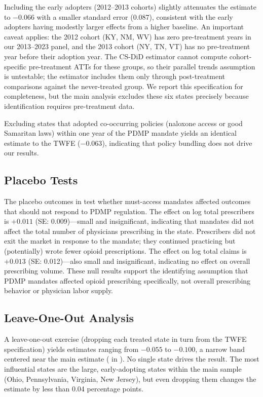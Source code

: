 \documentclass[12pt]{article}
\begin{document}
Including the early adopters (2012--2013 cohorts) slightly attenuates the estimate to $-0.066$ with a smaller standard error (0.087), consistent with the early adopters having modestly larger effects from a higher baseline. An important caveat applies: the 2012 cohort (KY, NM, WV) has zero pre-treatment years in our 2013--2023 panel, and the 2013 cohort (NY, TN, VT) has no pre-treatment year before their adoption year. The CS-DiD estimator cannot compute cohort-specific pre-treatment ATTs for these groups, so their parallel trends assumption is untestable; the estimator includes them only through post-treatment comparisons against the never-treated group. We report this specification for completeness, but the main analysis excludes these six states precisely because identification requires pre-treatment data.

Excluding states that adopted co-occurring policies (naloxone access or good Samaritan laws) within one year of the PDMP mandate yields an identical estimate to the TWFE ($-0.063$), indicating that policy bundling does not drive our results.

\subsection{Placebo Tests}\label{sec:robust_placebo}

The placebo outcomes in  test whether must-access mandates affected outcomes that should not respond to PDMP regulation. The effect on log total prescribers is $+0.011$ (SE: 0.009)---small and insignificant, indicating that mandates did not affect the total number of physicians prescribing in the state. Prescribers did not exit the market in response to the mandate; they continued practicing but (potentially) wrote fewer opioid prescriptions. The effect on log total claims is $+0.013$ (SE: 0.012)---also small and insignificant, indicating no effect on overall prescribing volume. These null results support the identifying assumption that PDMP mandates affected opioid prescribing specifically, not overall prescribing behavior or physician labor supply.

\subsection{Leave-One-Out Analysis}\label{sec:robust_loo}

A leave-one-out exercise (dropping each treated state in turn from the TWFE specification) yields estimates ranging from $-0.055$ to $-0.100$, a narrow band centered near the main estimate ( in ). No single state drives the result. The most influential states are the large, early-adopting states within the main sample (Ohio, Pennsylvania, Virginia, New Jersey), but even dropping them changes the estimate by less than 0.04 percentage points.
\end{document}

